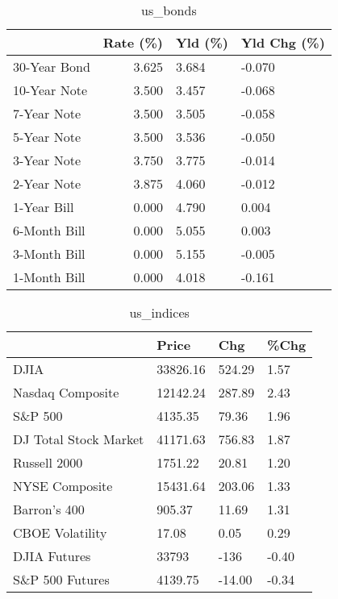 \documentclass{article}%
\begin{document}
%


\begin{table}[htbp]%
\caption{us\_bonds}%
\centering%
\begin{adjustbox}{width=1\textwidth}%
\begin{tabular}{lrll}
\toprule
             &  Rate (\%) & Yld (\%) & Yld Chg (\%) \\
\midrule
30-Year Bond &     3.625 &   3.684 &      -0.070 \\
10-Year Note &     3.500 &   3.457 &      -0.068 \\
 7-Year Note &     3.500 &   3.505 &      -0.058 \\
 5-Year Note &     3.500 &   3.536 &      -0.050 \\
 3-Year Note &     3.750 &   3.775 &      -0.014 \\
 2-Year Note &     3.875 &   4.060 &      -0.012 \\
 1-Year Bill &     0.000 &   4.790 &       0.004 \\
6-Month Bill &     0.000 &   5.055 &       0.003 \\
3-Month Bill &     0.000 &   5.155 &      -0.005 \\
1-Month Bill &     0.000 &   4.018 &      -0.161 \\
\bottomrule
\end{tabular}
%
\end{adjustbox}%
\end{table}

%


\begin{table}[htbp]%
\caption{us\_indices}%
\centering%
\begin{adjustbox}{width=1\textwidth}%
\begin{tabular}{llll}
\toprule
                      &    Price &    Chg &  \%Chg \\
\midrule
                 DJIA & 33826.16 & 524.29 &  1.57 \\
     Nasdaq Composite & 12142.24 & 287.89 &  2.43 \\
              S\&P 500 &  4135.35 &  79.36 &  1.96 \\
DJ Total Stock Market & 41171.63 & 756.83 &  1.87 \\
         Russell 2000 &  1751.22 &  20.81 &  1.20 \\
       NYSE Composite & 15431.64 & 203.06 &  1.33 \\
         Barron's 400 &   905.37 &  11.69 &  1.31 \\
      CBOE Volatility &    17.08 &   0.05 &  0.29 \\
         DJIA Futures &    33793 &   -136 & -0.40 \\
      S\&P 500 Futures &  4139.75 & -14.00 & -0.34 \\
\bottomrule
\end{tabular}
%
\end{adjustbox}%
\end{table}
\end{document}

